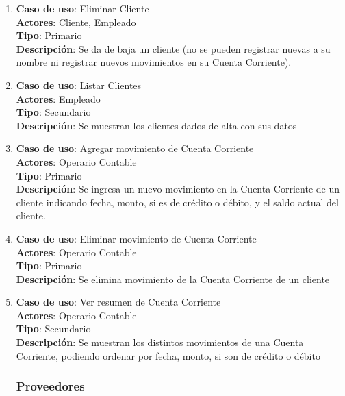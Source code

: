 \documentclass[12pt]{extarticle}
\begin{document}
\begin{spacing}{1.2}
\begin{enumerate}
        \item 	\textbf{Caso de uso}: Eliminar Cliente\\
                \textbf{Actores}: Cliente, Empleado\\
                \textbf{Tipo}: Primario\\
                \textbf{Descripción}: Se da de baja un cliente (no se pueden registrar nuevas \OTs{} a su nombre ni registrar nuevos movimientos en su Cuenta Corriente).

        \item 	\textbf{Caso de uso}: Listar Clientes\\
                \textbf{Actores}: Empleado\\
                \textbf{Tipo}: Secundario\\
                \textbf{Descripción}: Se muestran los clientes dados de alta con sus datos

        \item 	\textbf{Caso de uso}: Agregar movimiento de Cuenta Corriente\\
                \textbf{Actores}: Operario Contable\\
                \textbf{Tipo}: Primario\\
                \textbf{Descripción}: Se ingresa un nuevo movimiento en la Cuenta Corriente de un cliente indicando fecha, monto, si es de crédito o débito, y el saldo actual del cliente.

        \item   \textbf{Caso de uso}: Eliminar movimiento de Cuenta Corriente\\
                \textbf{Actores}: Operario Contable\\
                \textbf{Tipo}: Primario\\
                \textbf{Descripción}: Se elimina movimiento de la Cuenta Corriente de un cliente

        \item   \textbf{Caso de uso}: Ver resumen de Cuenta Corriente\\
                \textbf{Actores}: Operario Contable\\
                \textbf{Tipo}: Secundario\\
                \textbf{Descripción}: Se muestran los distintos movimientos de una Cuenta Corriente, podiendo ordenar por fecha, monto, si son de crédito o débito



        \subsubsection{Proveedores}




\end{enumerate}
\end{spacing}
\end{document}
